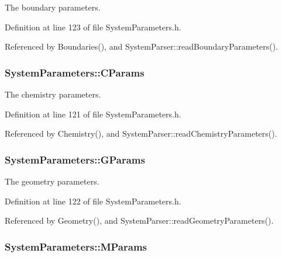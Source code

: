The boundary parameters. 



Definition at line 123 of file System\+Parameters.\+h.



Referenced by Boundaries(), and System\+Parser\+::read\+Boundary\+Parameters().

\hypertarget{classSystemParameters_aca60412ffdeba39dd42733d8c7ce13a8}{
\subsubsection[{C\+Params}]{ System\+Parameters\+::\+C\+Params\hspace{0.3cm}{\ttfamily [static]}}}\label{classSystemParameters_aca60412ffdeba39dd42733d8c7ce13a8}


The chemistry parameters. 



Definition at line 121 of file System\+Parameters.\+h.



Referenced by Chemistry(), and System\+Parser\+::read\+Chemistry\+Parameters().

\hypertarget{classSystemParameters_ae96aa9a5a7f9accf304a44349b97a5ed}{
\subsubsection[{G\+Params}]{ System\+Parameters\+::\+G\+Params\hspace{0.3cm}{\ttfamily [static]}}}\label{classSystemParameters_ae96aa9a5a7f9accf304a44349b97a5ed}


The geometry parameters. 



Definition at line 122 of file System\+Parameters.\+h.



Referenced by Geometry(), and System\+Parser\+::read\+Geometry\+Parameters().

\hypertarget{classSystemParameters_a6640957e85bee1d107f2c9e8e0f4ca9d}{
\subsubsection[{M\+Params}]{ System\+Parameters\+::\+M\+Params\hspace{0.3cm}{\ttfamily [static]}}}\label{classSystemParameters_a6640957e85bee1d107f2c9e8e0f4ca9d}



